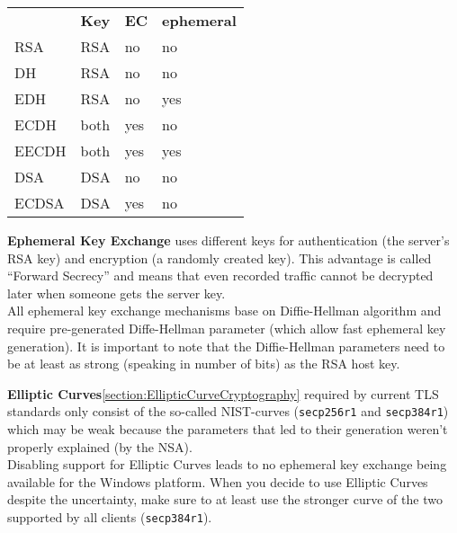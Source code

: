\begin{center}
\begin{tabular}{| l | l | l | l |}
    \toprule
 & \textbf{Key}  & \textbf{\cellcolor{orange}EC}  & \textbf{\cellcolor{green}ephemeral} \\ \cmidrule(lr){1-4}
    \cellcolor{red}    RSA   & RSA  & \cellcolor{green}no   & \cellcolor{red} no         \\
    \cellcolor{red}    DH    & RSA  & \cellcolor{green}no   & \cellcolor{red} no         \\
    \cellcolor{green}  EDH   & RSA  & \cellcolor{green}no   & \cellcolor{green} yes      \\
    \cellcolor{red}    ECDH  & both & \cellcolor{orange}yes & \cellcolor{red} no         \\
    \cellcolor{orange} EECDH & both & \cellcolor{orange}yes & \cellcolor{green} yes      \\
    \cellcolor{red}    DSA   & DSA  & \cellcolor{green}no   & \cellcolor{red} no         \\
    \cellcolor{red}    ECDSA & DSA  & \cellcolor{orange}yes & \cellcolor{red} no         \\
\bottomrule
\end{tabular}
\end{center}

\textbf{Ephemeral Key Exchange} uses different keys for authentication (the server's RSA
key) and encryption (a randomly created key). This advantage is called ``Forward
Secrecy'' and means that even recorded traffic cannot be decrypted later when someone
gets the server key. \\
All ephemeral key exchange mechanisms base on Diffie-Hellman algorithm and require
pre-generated Diffe-Hellman parameter (which allow fast ephemeral key generation). It
is important to note that the Diffie-Hellman parameters need to be at least as strong
(speaking in number of bits) as the RSA host key. 


\textbf{Elliptic Curves}\ref{section:EllipticCurveCryptography} required by current TLS
standards only consist of the so-called NIST-curves (\texttt{secp256r1} and
\texttt{secp384r1}) which may be weak because the parameters that led to their generation
weren't properly explained (by the NSA). \\
Disabling support for Elliptic Curves leads to no ephemeral key exchange being available
for the Windows platform. When you decide to use Elliptic Curves despite the uncertainty,
make sure to at least use the stronger curve of the two supported by all clients
(\texttt{secp384r1}).


